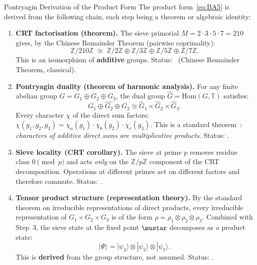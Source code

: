 \documentclass[12pt,a4paper]{article}
\begin{document}
\begin{thmbox}{Pontryagin Derivation of the Product Form}
\label{thm:pontryagin}
The product form~\eqref{eq:BA5} is derived from the following chain,
each step being a theorem or algebraic identity:

\begin{enumerate}[leftmargin=*, label=\textbf{Step \arabic*.}]
\item \textbf{CRT factorisation (theorem).}
  The sieve primorial $M = 2 \cdot 3 \cdot 5 \cdot 7 = 210$ gives,
  by the Chinese Remainder Theorem (pairwise coprimality):
  \begin{equation}
    \mathbb{Z}/210\mathbb{Z} \;\cong\; \mathbb{Z}/2\mathbb{Z} \oplus
    \mathbb{Z}/3\mathbb{Z} \oplus \mathbb{Z}/5\mathbb{Z} \oplus
    \mathbb{Z}/7\mathbb{Z}.
    \label{eq:CRT_210}
  \end{equation}
  This is an isomorphism of \textbf{additive} groups. Status: \THMTAG\
  (Chinese Remainder Theorem, classical).

\item \textbf{Pontryagin duality (theorem of harmonic analysis).}
  For any finite abelian group $G = G_1 \oplus G_2 \oplus G_3$, the
  dual group $\hat{G} = \mathrm{Hom}(G, \mathbb{T})$ satisfies:
  \begin{equation}
    \widehat{G_1 \oplus G_2 \oplus G_3} \cong
    \hat{G}_1 \times \hat{G}_2 \times \hat{G}_3.
    \label{eq:pontryagin_factor}
  \end{equation}
  Every character $\chi$ of the direct sum factors:
  $\chi(g_1, g_2, g_3) = \chi_a(g_1) \cdot \chi_b(g_2) \cdot \chi_c(g_3)$.
  This is a standard theorem~\cite{Rudin1962}: \emph{characters of
  additive direct sums are multiplicative products.} Status: \THMTAG.

\item \textbf{Sieve locality (CRT corollary).}
  The sieve at prime $p$ removes residue class $0 \pmod{p}$ and acts
  \emph{only} on the $\mathbb{Z}/p\mathbb{Z}$ component of the
  CRT decomposition. Operations at different primes act on different
  factors and therefore commute. Status: \IDTAG.

\item \textbf{Tensor product structure (representation theory).}
  By the standard theorem on irreducible representations of direct
  products, every irreducible representation of
  $G_1 \times G_2 \times G_3$ is of the form
  $\rho = \rho_1 \otimes \rho_2 \otimes \rho_3$.
  Combined with Step~3, the sieve state at the fixed point $\mustar$
  decomposes as a product state:
  \begin{equation}
    |\Psi\rangle = |\psi_3\rangle \otimes |\psi_5\rangle
    \otimes |\psi_7\rangle.
    \label{eq:product_state}
  \end{equation}
  This is \textbf{derived} from the group structure, not assumed.
  Status: \THMTAG.


\end{enumerate}
\end{thmbox}
\end{document}
